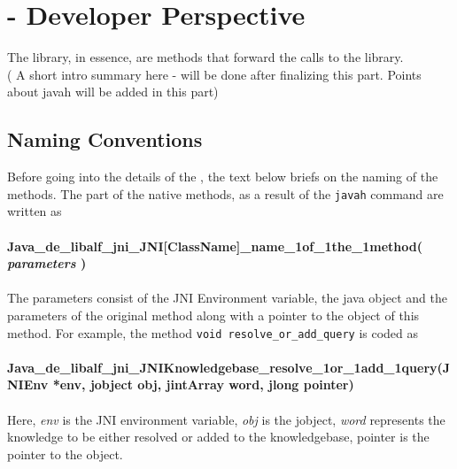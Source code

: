 \section{\jalf - Developer Perspective}
The \jalf library, in essence, are methods that forward the calls to the \libalf library. \\
( A short intro summary here - will be done after finalizing this part. Points about javah will be added in this part) \\

\subsection{Naming Conventions}
Before going into the details of the \jalf, the text below briefs on the naming of the methods. 
The \cpp part of the native methods, as a result of the \texttt{javah} command are written as \\ \\
\textbf{Java\_de\_libalf\_jni\_JNI[ClassName]\_name\_1of\_1the\_1method( \emph{parameters} )} \\ \\
The parameters consist of the JNI Environment variable, the java object and the parameters of the original method along with a pointer to the object of this method. For example, the method \texttt{void resolve\_or\_add\_query} is coded as \\ \\
\textbf{Java\_de\_libalf\_jni\_JNIKnowledgebase\_resolve\_1or\_1add\_1query(JNIEnv *env, jobject obj, jintArray word, jlong pointer)} \\ \\
Here, \emph{env} is the JNI environment variable,  \emph{obj} is the jobject, \emph{word} represents the knowledge to be either resolved or added to the knowledgebase, pointer is the pointer to the \cpp object. 

